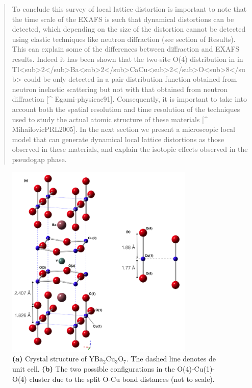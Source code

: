 \begin{quote}
To conclude this survey of local lattice distortion is important to note that the time scale of the EXAFS is such that dynamical distortions can be detected, which depending on the size of the distortion cannot be detected using elastic techniques like neutron diffraction (see section of Results). This can explain some of the differences between diffraction and EXAFS results.  Indeed it has been shown that the two-site O(4) distribution in in Tl<sub>2</sub>Ba<sub>2</sub>CaCu<sub>2</sub>O<sub>8</sub> could be only detected  in a pair distribution function obtained from neutron inelastic scattering but not with that obtained from neutron diffraction [^ Egami-physicac91].  Consequently, it is important to take into account both the spatial resolution and time resolution of the techniques used to study the actual atomic structure of these materials [^ MihailovicPRL2005]. In the next section we present a microscopic local model that can generate  dynamical local lattice distortions as those observed in these materials, and explain the isotopic effects observed in the pseudogap phase.
\end{quote}

\begin{figure}[ht!]
\centering
\includegraphics[width=0.8\textwidth]{images/YBCO_O-Cu-Ov2.jpg}
\caption{\textbf{(a)} Crystal structure of YBa$_{2}$Cu$_{3}$O$_{7}$. The dashed line denotes de unit cell. \textbf{(b)} The two possible configurations in the O(4)-Cu(1)-O(4) cluster due to the split O-Cu bond distances (not to scale).
}
\label{fig:YBCO_structure}
\end{figure}


